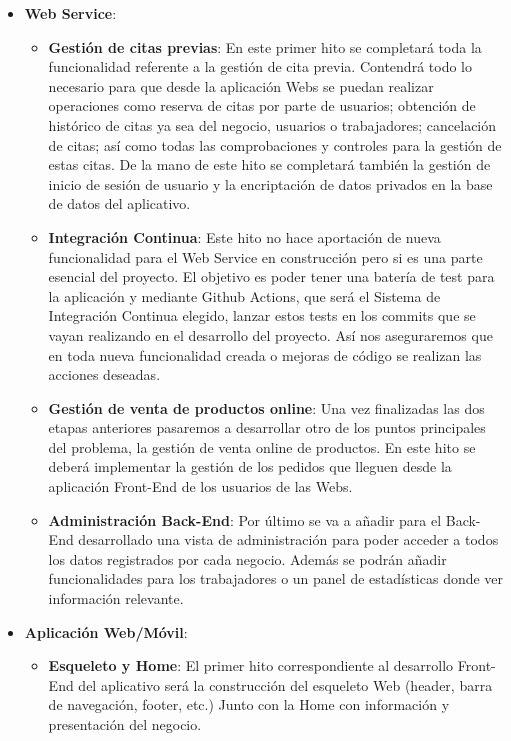 \vspace{0.5em}
\begin{itemize}
    \item \textbf{Web Service}:
        \begin{itemize}
            \item \textbf{Gestión de citas previas}: En este primer hito se completará toda la funcionalidad referente
            a la gestión de cita previa. Contendrá todo lo necesario para que desde la aplicación Webs se puedan
            realizar operaciones como reserva de citas por parte de usuarios; obtención de histórico de citas ya
            sea del negocio, usuarios o trabajadores; cancelación de citas; así como todas las comprobaciones y
            controles para la gestión de estas citas. De la mano de este hito se completará también la gestión
            de inicio de sesión de usuario y la encriptación de datos privados en la base de datos del aplicativo.

            \item \textbf{Integración Continua}: Este hito no hace aportación de nueva funcionalidad
            para el Web Service en construcción pero si es una parte esencial del proyecto. El objetivo
            es poder tener una batería de test para la aplicación y mediante
            Github Actions, que será el Sistema de Integración Continua elegido, lanzar estos tests en los commits
            que se vayan realizando en el desarrollo del proyecto. Así nos aseguraremos que en toda nueva funcionalidad
            creada o mejoras de código se realizan las acciones deseadas.

            \item \textbf{Gestión de venta de productos online}: Una vez finalizadas las dos etapas anteriores
            pasaremos a desarrollar otro de los puntos principales del problema, la gestión de venta online de
            productos. En este hito se deberá implementar la gestión de los pedidos que lleguen desde la aplicación
            Front-End de los usuarios de las Webs.

            \item \textbf{Administración Back-End}: Por último se va a añadir para el Back-End desarrollado una vista
            de administración para poder acceder a todos los datos registrados por cada negocio. Además se podrán
            añadir funcionalidades para los trabajadores o un panel de estadísticas donde ver información relevante.
        \end{itemize}
    \item \textbf{Aplicación Web/Móvil}:
    \begin{itemize}
                \item \textbf{Esqueleto y Home}: El primer hito correspondiente al desarrollo Front-End del aplicativo
                será la construcción del esqueleto Web (header, barra de navegación, footer, etc.) Junto con la Home
                con información y presentación del negocio.


\end{itemize}
\end{itemize}
